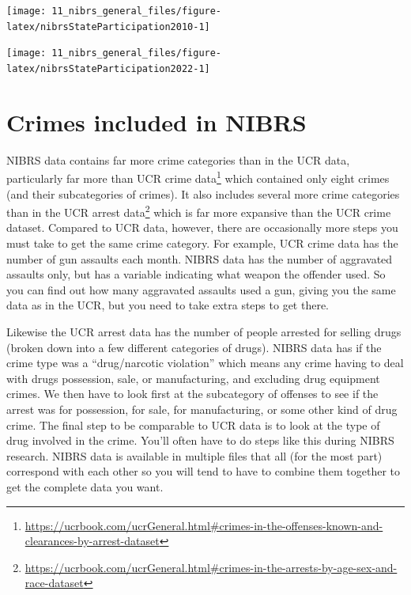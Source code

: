 \documentclass[
]{krantz}
\let\origfigure\figure
\let\endorigfigure\endfigure
\renewenvironment{figure}[1][2] {
    \expandafter\origfigure\expandafter[H]
} {
    \endorigfigure
}
\renewcommand{\href}[2]{#2\footnote{\url{#1}}}
\begin{document}
\begin{figure}

{\centering \texttt{[image: 11\_nibrs\_general\_files/figure-latex/nibrsStateParticipation2010-1]} 

}

\caption{The percent of each state's population that is covered by police agencies reporting at least one month of data to NIBRS, 2010}\label{fig:nibrsStateParticipation2010}
\end{figure}

\begin{figure}

{\centering \texttt{[image: 11\_nibrs\_general\_files/figure-latex/nibrsStateParticipation2022-1]} 

}

\caption{The percent of each state's population that is covered by police agencies reporting at least one month of data to NIBRS, 2023 (using 2022 ACS 5-year Census data)}\label{fig:nibrsStateParticipation2022}
\end{figure}

\section{Crimes included in
NIBRS}\label{crimes-included-in-nibrs}

NIBRS data contains far more crime categories than in the
UCR data, particularly far more than
\href{https://ucrbook.com/ucrGeneral.html\#crimes-in-the-offenses-known-and-clearances-by-arrest-dataset}{UCR
crime data} which contained only eight crimes (and their
subcategories of crimes). It also includes several more
crime categories than in the
\href{https://ucrbook.com/ucrGeneral.html\#crimes-in-the-arrests-by-age-sex-and-race-dataset}{UCR
arrest data} which is far more expansive than the UCR crime
dataset. Compared to UCR data, however, there are
occasionally more steps you must take to get the same crime
category. For example, UCR crime data has the number of gun
assaults each month. NIBRS data has the number of aggravated
assaults only, but has a variable indicating what weapon the
offender used. So you can find out how many aggravated
assaults used a gun, giving you the same data as in the UCR,
but you need to take extra steps to get there.

Likewise the UCR arrest data has the number of people
arrested for selling drugs (broken down into a few different
categories of drugs). NIBRS data has if the crime type was a
``drug/narcotic violation'' which means any crime having to
deal with drugs possession, sale, or manufacturing, and
excluding drug equipment crimes. We then have to look first
at the subcategory of offenses to see if the arrest was for
possession, for sale, for manufacturing, or some other kind
of drug crime. The final step to be comparable to UCR data
is to look at the type of drug involved in the crime. You'll
often have to do steps like this during NIBRS research.
NIBRS data is available in multiple files that all (for the
most part) correspond with each other so you will tend to
have to combine them together to get the complete data you
want.
\end{document}
